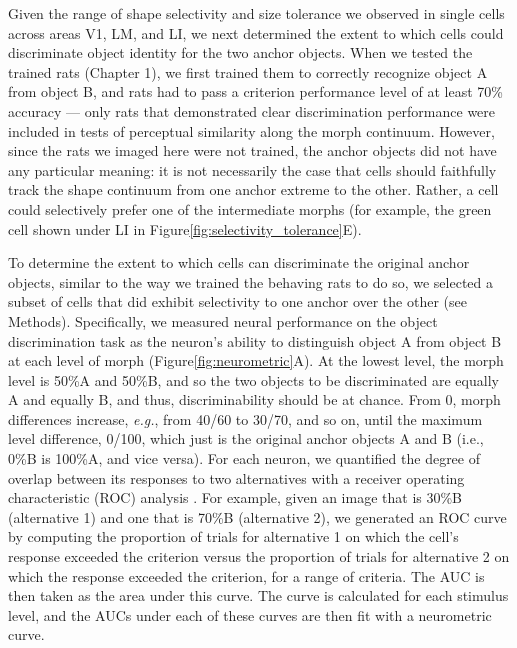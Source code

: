 Given the range of shape selectivity and size tolerance we observed in single cells across areas V1, LM, and LI, we next determined the extent to which cells could discriminate object identity for the two anchor objects. When we tested the trained rats (Chapter 1), we first trained them to correctly recognize object A from object B, and rats had to pass a criterion performance level of at least 70\% accuracy --- only rats that demonstrated clear discrimination performance were included in tests of perceptual similarity along the morph continuum. However, since the rats we imaged here were not trained, the anchor objects did not have any particular meaning: it is not necessarily the case that cells should faithfully track the shape continuum from one anchor extreme to the other. Rather, a cell could selectively prefer one of the intermediate morphs (for example, the green cell shown under LI in Figure\ref{fig:selectivity_tolerance}E). 

To determine the extent to which cells can discriminate the original anchor objects, similar to the way we trained the behaving rats to do so, we selected a subset of cells that did exhibit selectivity to one anchor over the other (see Methods). Specifically, we measured neural performance on the object discrimination task as the neuron's ability to distinguish object A from object B at each level of morph (Figure\ref{fig:neurometric}A). At the lowest level, the morph level is 50\%A and 50\%B, and so the two objects to be discriminated are equally A and equally B, and thus, discriminability should be at chance. From 0, morph differences increase, \textit{e.g.}, from 40/60 to 30/70, and so on, until the maximum level difference, 0/100, which just is the original anchor objects A and B (i.e., 0\%B is 100\%A, and vice versa). For each neuron, we quantified the degree of overlap between its responses to two alternatives with a receiver operating characteristic (ROC) analysis \cite{Green1966, Britten1992, Rust2010}. For example, given an image that is 30\%B (alternative 1) and one that is 70\%B (alternative 2), we generated an ROC curve by computing the proportion of trials for alternative 1 on which the cell's response exceeded the criterion versus the proportion of trials for alternative 2 on which the response exceeded the criterion, for a range of criteria. The AUC is then taken as the area under this curve. The curve is calculated for each stimulus level, and the AUCs under each of these curves are then fit with a neurometric curve. 

